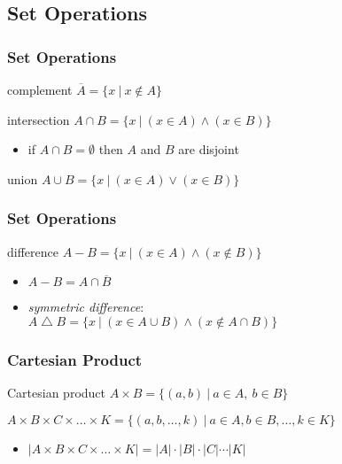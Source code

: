 \documentclass[dvipsnames]{beamer}
\begin{document}
\subsection{Set Operations}

\begin{frame}
  \frametitle{Set Operations}

  \begin{block}{complement}
    $\overline{A} = \{x~|~x \notin A\}$
  \end{block}

  \pause
  \begin{block}{intersection}
    $A \cap B = \{x~|~(x \in A) \wedge (x \in B)\}$

    \begin{itemize}
      \item if $A \cap B = \emptyset$ then $A$ and $B$ are \alert{disjoint}
    \end{itemize}
  \end{block}

  \pause
  \begin{block}{union}
    $A \cup B = \{x~|~(x \in A) \vee (x \in B)\}$
  \end{block}
\end{frame}

\begin{frame}
  \frametitle{Set Operations}

  \begin{block}{difference}
    $A - B = \{x~|~(x \in A) \wedge (x \notin B)\}$

    \begin{itemize}
      \item $A-B = A \cap \overline{B}$
    \end{itemize}
  \end{block}

  \pause
  \begin{itemize}
    \item \emph{symmetric difference}:\\
      $A \bigtriangleup B = \{x~|~(x \in A \cup B) \wedge (x \notin A \cap B)\}$
  \end{itemize}
\end{frame}

\begin{frame}
  \frametitle{Cartesian Product}

  \begin{block}{Cartesian product}
    $A \times B = \{(a, b)~|~a \in A,~b \in B\}$

    \medskip
    $A \times B \times C \times \dots \times K =
      \{(a, b, \ldots, k)~|~a \in A, b \in B, \ldots, k \in K\}$
  \end{block}

  \medskip
  \begin{itemize}
    \item $|A \times B \times C \times \dots \times K| =
      |A| \cdot |B| \cdot |C| \cdots |K|$
  \end{itemize}
\end{frame}
\end{document}
